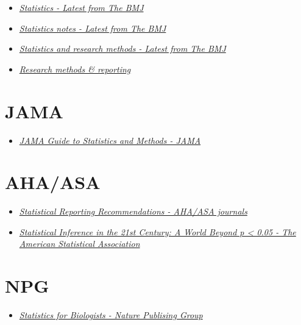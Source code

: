 \documentclass[
]{book}
\providecommand{\tightlist}{%
  \setlength{\itemsep}{0pt}\setlength{\parskip}{0pt}}
\begin{document}
\begin{itemize}
\item
  \href{https://www.bmj.com/specialties/statistics}{\emph{Statistics - Latest from The BMJ}}
\item
  \href{https://www.bmj.com/specialties/statistics-notes}{\emph{Statistics notes - Latest from The BMJ}}
\item
  \href{https://www.bmj.com/specialties/statistics-and-research-methods}{\emph{Statistics and research methods - Latest from The BMJ}}
\item
  \href{https://www.bmj.com/research/research-methods-and-reporting}{\emph{Research methods \& reporting}}
\end{itemize}

\hypertarget{jama}{%
\section{JAMA}\label{jama}}

\begin{itemize}
\tightlist
\item
  \href{https://jamanetwork.com/collections/44042/jama-guide-to-statistics-and-methods}{\emph{JAMA Guide to Statistics and Methods - JAMA}}
\end{itemize}

\hypertarget{aha-asa}{%
\section{AHA/ASA}\label{aha-asa}}

\begin{itemize}
\item
  \href{https://www.ahajournals.org/statistical-recommendations}{\emph{Statistical Reporting Recommendations - AHA/ASA journals}}
\item
  \href{https://www.tandfonline.com/toc/utas20/73/sup1?nav=tocList}{\emph{Statistical Inference in the 21st Century: A World Beyond p \textless{} 0.05 - The American Statistical Association}}
\end{itemize}

\hypertarget{npg}{%
\section{NPG}\label{npg}}

\begin{itemize}
\tightlist
\item
  \href{https://www.nature.com/collections/qghhqm}{\emph{Statistics for Biologists - Nature Publising Group}}
\end{itemize}
\end{document}
